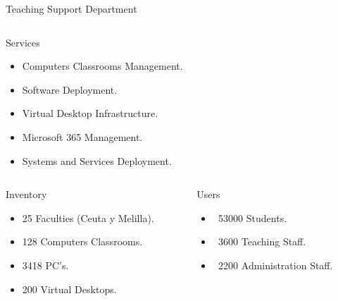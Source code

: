 \documentclass[table, unknownkeysallowed, 10pt]{beamer}
\begin{document}
\begin{frame}{Teaching Support Department}

    \begin{columns}[T]
        \begin{column}{0.9\linewidth}
            \begin{block}{Services}
                \begin{itemize}
                    \item Computers Classrooms Management.
                    \item Software Deployment.
                    \item Virtual Desktop Infrastructure.
                    \item Microsoft 365 Management.
                    \item Systems and Services Deployment.
                \end{itemize}

            \end{block}
        \end{column}
    \end{columns}


    \begin{columns}[T]
        \begin{column}{0.5\linewidth}
            \begin{block}{Inventory}
                \begin{itemize}
                    \item 25 Faculties (Ceuta y Melilla).
                    \item 128 Computers Classrooms.
                    \item 3418 PC's.
                    \item 200 Virtual Desktops.
                \end{itemize}
            \end{block}
        \end{column}
        \begin{column}{0.4\linewidth}
            \begin{block}{Users}
                \begin{itemize}
                    \item ~53000 Students.
                    \item ~3600 Teaching Staff.
                    \item ~2200 Administration Staff.
                \end{itemize}
            \end{block}
        \end{column}
    \end{columns}

\end{frame}
\end{document}
